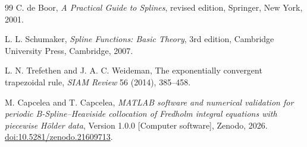 \documentclass[11pt,a4paper]{amsart}
\theoremstyle{plain}
\theoremstyle{definition}
\theoremstyle{remark}
\begin{document}
\begin{thebibliography}{99}
C. de Boor,
\emph{A Practical Guide to Splines}, revised edition,
Springer, New York, 2001.

L. L. Schumaker,
\emph{Spline Functions: Basic Theory}, 3rd edition,
Cambridge University Press, Cambridge, 2007.

L. N. Trefethen and J. A. C. Weideman,
The exponentially convergent trapezoidal rule,
\emph{SIAM Review} 56 (2014), 385--458.

M. Capcelea and T. Capcelea,
\emph{MATLAB software and numerical validation for periodic B-Spline–Heaviside collocation of Fredholm integral equations with piecewise H\"older data},
Version 1.0.0 [Computer software], Zenodo, 2026.
\href{https://doi.org/10.5281/zenodo.21609713}{doi:10.5281/zenodo.21609713}.


\end{thebibliography}
\end{document}
